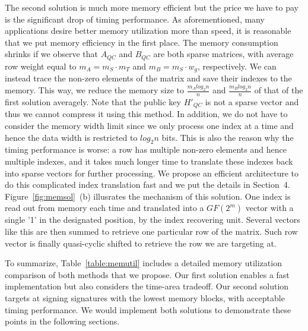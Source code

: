 \documentclass[10pt,journal,compsoc]{IEEEtran}
\begin{document}
The second solution is much more memory efficient but the price we have to pay is the significant drop of timing performance. As aforementioned, many applications desire better memory utilization more than speed, it is reasonable that we put memory efficiency in the first place. The memory consumption shrinks if we observe that $A_{QC}$ and $B_{QC}$ are both sparse matrices, with average row weight equal to $m_A=m_S\cdot m_T$ and $m_B=m_S\cdot w_g$, respectively. We can instead trace the non-zero elements of the matrix and save their indexes to the memory. This way, we reduce the memory size to  $\frac{m_Alog_2n}{n}$ and $\frac{m_Blog_2n}{n}$ of that of the first solution averagely. Note that the public key $H'_{QC}$  is  not a sparse vector and thus we cannot compress it using this method.
In addition, we do not have to consider the memory width limit since we only process one index at a time and hence the data width is restricted to $log_2n$ bits. This is also the reason why the timing performance is worse:  a row has  multiple non-zero elements and hence multiple indexes,  and it takes much longer time to translate these indexes back into sparse vectors for further processing. We propose an efficient architecture to do this complicated index translation fast and we put the details in Section~4. Figure~\ref{fig:memsol}~(b) illusrates the mechanism of this solution. One index is read out from memory each time and translated into a $GF(2^m)$ vector with a single '1' in the designated position, by the index recovering unit. Several vectors like this are then summed to retrieve one particular row of the matrix. Such row vector is finally quasi-cyclic shifted to retrieve the row we are targeting at.

To summarize, Table~\ref{table:memutil} includes a detailed memory utilization comparison of both methods that we propose. Our first solution enables a fast implementation but also considers the time-area tradeoff. Our second solution targets at signing signatures with the lowest memory blocks, with acceptable timing performance. We would implement both solutions to demonstrate these points in the following sections.
\end{document}
